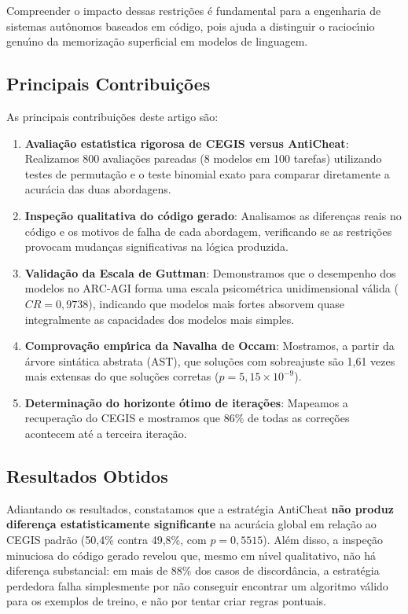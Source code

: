 Compreender o impacto dessas restri\c{c}\~{o}es \'{e} fundamental para a engenharia de sistemas aut\^{o}nomos baseados em c\'{o}digo, pois ajuda a distinguir o racioc\'{\i}nio genu\'{\i}no da memoriza\c{c}\~{a}o superficial em modelos de linguagem.

\subsection*{Principais Contribui\c{c}\~{o}es}

As principais contribui\c{c}\~{o}es deste artigo s\~{a}o:
\begin{enumerate}
    \item \textbf{Avalia\c{c}\~{a}o estat\'{\i}stica rigorosa de CEGIS versus AntiCheat}: Realizamos 800 avalia\c{c}\~{o}es pareadas (8 modelos em 100 tarefas) utilizando testes de permuta\c{c}\~{a}o e o teste binomial exato para comparar diretamente a acur\'{a}cia das duas abordagens.
    \item \textbf{Inspe\c{c}\~{a}o qualitativa do c\'{o}digo gerado}: Analisamos as diferen\c{c}as reais no c\'{o}digo e os motivos de falha de cada abordagem, verificando se as restri\c{c}\~{o}es provocam mudan\c{c}as significativas na l\'{o}gica produzida.
    \item \textbf{Valida\c{c}\~{a}o da Escala de Guttman}: Demonstramos que o desempenho dos modelos no ARC-AGI forma uma escala psicom\'{e}trica unidimensional v\'{a}lida ($CR = 0,9738$), indicando que modelos mais fortes absorvem quase integralmente as capacidades dos modelos mais simples.
    \item \textbf{Comprova\c{c}\~{a}o emp\'{\i}rica da Navalha de Occam}: Mostramos, a partir da \'{a}rvore sint\'{a}tica abstrata (AST), que solu\c{c}\~{o}es com sobreajuste s\~{a}o 1,61 vezes mais extensas do que solu\c{c}\~{o}es corretas ($p = 5,15 \times 10^{-9}$).
    \item \textbf{Determina\c{c}\~{a}o do horizonte \'{o}timo de itera\c{c}\~{o}es}: Mapeamos a recupera\c{c}\~{a}o do CEGIS e mostramos que 86\% de todas as corre\c{c}\~{o}es acontecem at\'{e} a terceira itera\c{c}\~{a}o.
\end{enumerate}

\subsection*{Resultados Obtidos}

Adiantando os resultados, constatamos que a estrat\'{e}gia AntiCheat \textbf{n\~{a}o produz diferen\c{c}a estatisticamente significante} na acur\'{a}cia global em rela\c{c}\~{a}o ao CEGIS padr\~{a}o (50,4\% contra 49,8\%, com $p = 0,5515$). Al\'{e}m disso, a inspe\c{c}\~{a}o minuciosa do c\'{o}digo gerado revelou que, mesmo em n\'{\i}vel qualitativo, n\~{a}o h\'{a} diferen\c{c}a substancial: em mais de 88\% dos casos de discord\^{a}ncia, a estrat\'{e}gia perdedora falha simplesmente por n\~{a}o conseguir encontrar um algoritmo v\'{a}lido para os exemplos de treino, e n\~{a}o por tentar criar regras pontuais.


